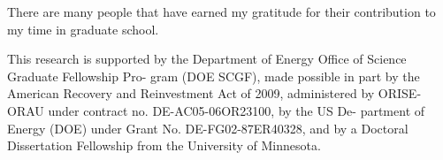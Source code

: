 
There are many people that have earned my gratitude for their contribution to my
time in graduate school. 

This research is supported by the Department of Energy Office of Science Graduate Fellowship Pro- gram (DOE SCGF), made possible in part by the American Recovery and Reinvestment Act of 2009, administered by ORISE-ORAU under contract no. DE-AC05-06OR23100, by the US De- partment of Energy (DOE) under Grant No. DE-FG02-87ER40328, and by a Doctoral Dissertation Fellowship from the University of Minnesota.

